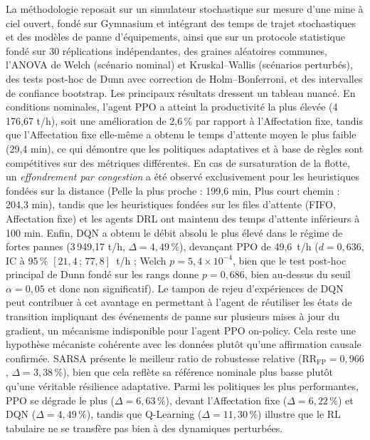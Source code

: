 \documentclass[11pt,a4paper]{article}
\begin{document}
La méthodologie reposait sur un simulateur stochastique sur mesure d'une mine à ciel ouvert, fondé sur Gymnasium et intégrant des temps de trajet stochastiques et des modèles de panne d'équipements, ainsi que sur un protocole statistique fondé sur 30 réplications indépendantes, des graines aléatoires communes, l'ANOVA de Welch (scénario nominal) et Kruskal--Wallis (scénarios perturbés), des tests post-hoc de Dunn avec correction de Holm--Bonferroni, et des intervalles de confiance bootstrap. Les principaux résultats dressent un tableau nuancé. En conditions nominales, l'agent PPO a atteint la productivité la plus élevée (4\,176,67 t/h), soit une amélioration de 2,6\,\% par rapport à l'Affectation fixe, tandis que l'Affectation fixe elle-même a obtenu le temps d'attente moyen le plus faible (29,4 min), ce qui démontre que les politiques adaptatives et à base de règles sont compétitives sur des métriques différentes. En cas de sursaturation de la flotte, un \textit{effondrement par congestion} a été observé exclusivement pour les heuristiques fondées sur la distance (Pelle la plus proche : 199,6 min, Plus court chemin : 204,3 min), tandis que les heuristiques fondées sur les files d'attente (FIFO, Affectation fixe) et les agents DRL ont maintenu des temps d'attente inférieurs à 100 min. Enfin, DQN a obtenu le débit absolu le plus élevé dans le régime de fortes pannes (3\,949,17 t/h, $\Delta=4{,}49\,\%$), devançant PPO de 49,6~t/h ($d=0{,}636$, IC à 95\,\% $[21{,}4\,;\,77{,}8]$~t/h ; Welch $p=5{,}4\times10^{-4}$, bien que le test post-hoc principal de Dunn fondé sur les rangs donne $p=0{,}686$, bien au-dessus du seuil $\alpha=0{,}05$ et donc non significatif). Le tampon de rejeu d'expériences de DQN peut contribuer à cet avantage en permettant à l'agent de réutiliser les états de transition impliquant des événements de panne sur plusieurs mises à jour du gradient, un mécanisme indisponible pour l'agent PPO on-policy. Cela reste une hypothèse mécaniste cohérente avec les données plutôt qu'une affirmation causale confirmée. SARSA présente le meilleur ratio de robustesse relative ($\text{RR}_{\mathrm{FP}}=0{,}966$, $\Delta=3{,}38\,\%$), bien que cela reflète sa référence nominale plus basse plutôt qu'une véritable résilience adaptative. Parmi les politiques les plus performantes, PPO se dégrade le plus ($\Delta=6{,}63\,\%$), devant l'Affectation fixe ($\Delta=6{,}22\,\%$) et DQN ($\Delta=4{,}49\,\%$), tandis que Q-Learning ($\Delta=11{,}30\,\%$) illustre que le RL tabulaire ne se transfère pas bien à des dynamiques perturbées.
\end{document}
